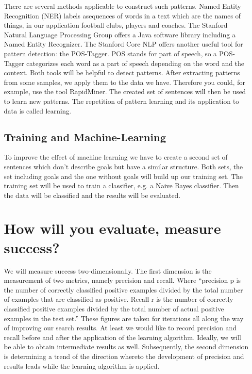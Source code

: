 \documentclass[11pt,titlepage,oneside,openany]{book}
\begin{document}
There are several methods applicable to construct such patterns. Named Entity Recognition (NER) labels asequences of words in a text which are the names of things, in our application football clubs, players and coaches. The Stanford Natural Language Processing Group offers a Java software library including a Named Entity Recognizer. The Stanford Core NLP offers another useful tool for pattern detection: the POS-Tagger. POS stands for part of speech, so a POS-Tagger categorizes each word as a part of speech depending on the word and the context. Both tools will be helpful to detect patterns.
After extracting patterns from some samples, we apply them to the data we have. Therefore you could, for example, use the tool RapidMiner. The created set of sentences will then be used to learn new patterns. The  repetition of pattern learning and its application to data is called learning.

\subsection{Training and Machine-Learning}
To improve the effect of machine learning we have to create a second set of sentences which don’t describe goals but have a similar structure. 
Both sets, the set including goals and the one without goals will build up our training set. The training set will be used to train a classifier, e.g. a Naive Bayes classifier. Then the data will be classified and the results will be evaluated.

\section{How will you evaluate, measure success?}

We will measure success two-dimensionally. The first dimension is the measurement of two metrics, namely precision and recall. Where ``precision p is the number of correctly classified positive examples divided by the total number of examples that are classified as positive. Recall r is the number of correctly classified positive examples divided by the total number of actual positive examples in the test set.'' \citep[p.103]{Liu2007} These figures are taken for iterations all along the way of improving our search results. At least we would like to record precision and recall before and after the application of the learning algorithm. Ideally, we will be able to obtain intermediate results as well. Subsequently, the second dimension is determining a trend of the direction whereto the development of precision and results leads while the learning algorithm is applied.



\end{document}
